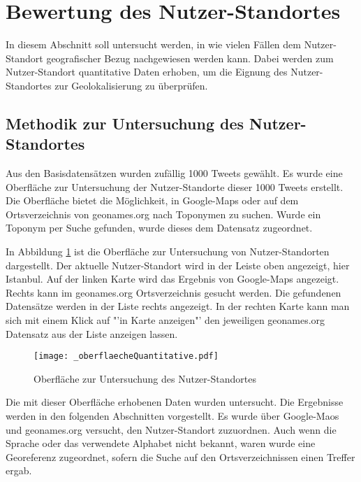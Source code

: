 	\section{Bewertung des Nutzer-Standortes}

		In diesem Abschnitt soll untersucht werden, in wie vielen Fällen dem Nutzer-Standort geografischer Bezug nachgewiesen werden kann.
		Dabei werden zum Nutzer-Standort quantitative Daten erhoben, um die Eignung des Nutzer-Standortes zur Geolokalisierung zu überprüfen.

		\subsection{Methodik zur Untersuchung des Nutzer-Standortes}

			Aus den Basisdatensätzen wurden zufällig 1000 Tweets gewählt. 
			Es wurde eine Oberfläche zur Untersuchung der Nutzer-Standorte dieser 1000 Tweets erstellt.
			Die Oberfläche bietet die Möglichkeit, in Google-Maps oder auf dem Ortsverzeichnis von geonames.org nach Toponymen zu suchen.
			Wurde ein Toponym per Suche gefunden, wurde dieses dem Datensatz zugeordnet.

			In Abbildung \ref{img:oberflaecheQuantitative} ist die Oberfläche zur Untersuchung von Nutzer-Standorten dargestellt. 
			Der aktuelle Nutzer-Standort wird in der Leiste oben angezeigt, hier Istanbul. 
			Auf der linken Karte wird das Ergebnis von Google-Maps angezeigt.
			Rechts kann im geonames.org Ortsverzeichnis gesucht werden. 
			Die gefundenen Datensätze werden in der Liste rechts angezeigt.  
			In der rechten Karte kann man sich mit einem Klick auf "'in Karte anzeigen"' den jeweiligen geonames.org Datensatz aus der Liste anzeigen lassen.

			\begin{figure}[!ht]
					\begin{center}
						\texttt{[image: \_oberflaecheQuantitative.pdf]}
						\caption{Oberfläche zur Untersuchung des Nutzer-Standortes}
						\label{img:oberflaecheQuantitative}
					\end{center}  
			\end{figure}	

			Die mit dieser Oberfläche erhobenen Daten wurden untersucht. 
			Die Ergebnisse werden in den folgenden Abschnitten vorgestellt.
			Es wurde über Google-Maos und geonames.org versucht, den Nutzer-Standort zuzuordnen. 
			Auch wenn die Sprache oder das verwendete Alphabet nicht bekannt, waren wurde eine Georeferenz zugeordnet, sofern die Suche auf den Ortsverzeichnissen einen Treffer ergab. 

